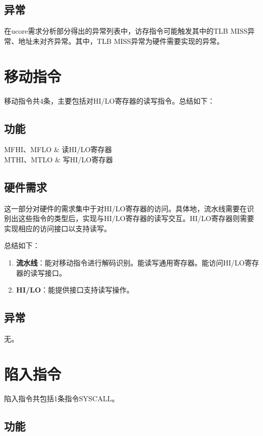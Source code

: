 \subsection{异常}

在ucore需求分析部分得出的异常列表中，访存指令可能触发其中的TLB MISS异常、地址未对齐异常。其中，TLB MISS异常为硬件需要实现的异常。

\section{移动指令}

移动指令共4条，主要包括对HI/LO寄存器的读写指令。总结如下：

\subsection{功能}

    MFHI、MFLO & 读HI/LO寄存器 \\
    MTHI、MTLO & 写HI/LO寄存器 \\
\tableend

\subsection{硬件需求}

这一部分对硬件的需求集中于对HI/LO寄存器的访问。具体地，流水线需要在识别出这些指令的类型后，实现与HI/LO寄存器的读写交互。HI/LO寄存器则需要实现相应的访问接口以支持读写。

总结如下：

\begin{enumerate}
    \item {\bf 流水线}：能对移动指令进行解码识别。能读写通用寄存器。能访问HI/LO寄存器的读写接口。
    \item {\bf HI/LO}：能提供接口支持读写操作。
\end{enumerate}

\subsection{异常}

无。

\section{陷入指令}

陷入指令共包括1条指令SYSCALL。

\subsection{功能}

